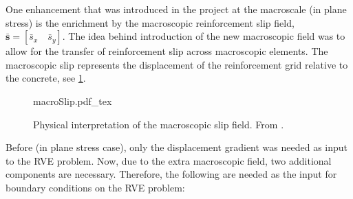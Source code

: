 \documentclass[11pt]{article}
\begin{document}
One enhancement that was introduced in the project at the macroscale (in plane stress) is the 
enrichment by the macroscopic reinforcement slip field, $\bm{\bar{s}} = \left[ \bar{s}_x \quad \bar{s}_y \right]$. 
The idea behind introduction of the new macroscopic field was to allow for the transfer of reinforcement slip across macroscopic elements. The macroscopic slip represents the displacement of the reinforcement grid relative to the concrete, see \cref{fig:macroslip}.

\begin{figure}[H]
    \centering
    \def\svgwidth{0.2\textwidth}
    {macroSlip.pdf_tex}
    \caption{Physical interpretation of the macroscopic slip field. From \cite{PaperB}.}
    \label{fig:macroslip}
\end{figure}

\noindent Before (in plane stress case), only the displacement gradient was needed as input to the RVE problem. Now, due to the extra macroscopic field, two additional components are necessary. Therefore, the following are needed as the input for boundary conditions on the RVE problem:
\end{document}
